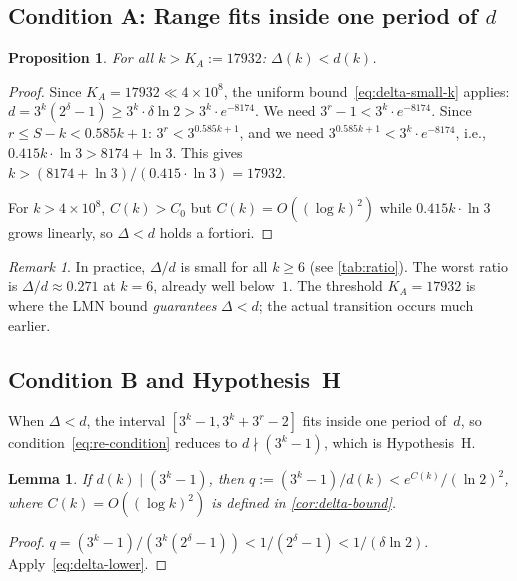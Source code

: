 \documentclass[11pt, a4paper]{amsart}
\theoremstyle{plain}
\newtheorem{proposition}[theorem]{Proposition}
\newtheorem{lemma}[theorem]{Lemma}
\theoremstyle{definition}
\theoremstyle{remark}
\newtheorem{remark}[theorem]{Remark}
\begin{document}
\subsection{Condition A: Range fits inside one period of $d$}
\label{ssec:condition-a}

\begin{proposition}\label{prop:cond-a}
  For all $k > K_A := 17932$: $\Delta(k) < d(k)$.
\end{proposition}

\begin{proof}
  Since $K_A = 17932 \ll 4 \times 10^8$,
  the uniform bound~\eqref{eq:delta-small-k} applies:
  $d = 3^k(2^\delta - 1) \geq 3^k \cdot \delta \ln 2
  > 3^k \cdot e^{-8174}$.
  We need $3^r - 1 < 3^k \cdot e^{-8174}$.
  Since $r \leq S - k < 0.585k + 1$:
  $3^r < 3^{0.585k+1}$, and we need
  $3^{0.585k+1} < 3^k \cdot e^{-8174}$, i.e.,
  $0.415k \cdot \ln 3 > 8174 + \ln 3$.
  This gives $k > (8174 + \ln 3)/(0.415 \cdot \ln 3) = 17932$.

  For $k > 4 \times 10^8$, $C(k) > C_0$ but
  $C(k) = O((\log k)^2)$ while
  $0.415k \cdot \ln 3$ grows linearly, so
  $\Delta < d$ holds a fortiori.
\end{proof}

\begin{remark}\label{rem:practical}
  In practice, $\Delta/d$ is small for all $k \geq 6$
  (see \cref{tab:ratio}).  The worst ratio is $\Delta/d
  \approx 0.271$ at $k = 6$, already well below~$1$.
  The threshold $K_A = 17932$ is where the LMN bound
  \emph{guarantees} $\Delta < d$; the actual transition
  occurs much earlier.
\end{remark}

\subsection{Condition B and Hypothesis~H}\label{ssec:condition-b}

When $\Delta < d$, the interval $[3^k-1, 3^k+3^r-2]$
fits inside one period of~$d$, so condition~\eqref{eq:re-condition}
reduces to $d \nmid (3^k - 1)$, which is Hypothesis~H.

\begin{lemma}\label{lem:q-bound}
  If $d(k) \mid (3^k - 1)$, then
  $q := (3^k - 1)/d(k) < e^{C(k)} / (\ln 2)^2$,
  where $C(k) = O((\log k)^2)$ is defined
  in \cref{cor:delta-bound}.
\end{lemma}

\begin{proof}
  $q = (3^k-1)/(3^k(2^\delta - 1)) < 1/(2^\delta - 1)
  < 1/(\delta \ln 2)$.  Apply~\eqref{eq:delta-lower}.
\end{proof}
\end{document}
